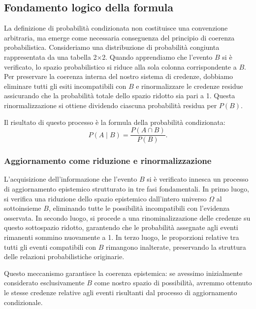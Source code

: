 \documentclass[
  letterpaper,
  DIV=11,
  numbers=noendperiod,
  oneside]{scrreprt}
\theoremstyle{definition}
\theoremstyle{plain}
\theoremstyle{definition}
\theoremstyle{remark}
\begin{document}
\subsection{Fondamento logico della
formula}\label{fondamento-logico-della-formula}

La definizione di probabilità condizionata non costituisce una
convenzione arbitraria, ma emerge come necessaria conseguenza del
principio di coerenza probabilistica. Consideriamo una distribuzione di
probabilità congiunta rappresentata da una tabella 2×2. Quando
apprendiamo che l'evento \(B\) si è verificato, lo spazio probabilistico
si riduce alla sola colonna corrispondente a \(B\). Per preservare la
coerenza interna del nostro sistema di credenze, dobbiamo eliminare
tutti gli esiti incompatibili con \(B\) e rinormalizzare le credenze
residue assicurando che la probabilità totale dello spazio ridotto sia
pari a 1. Questa rinormalizzazione si ottiene dividendo ciascuna
probabilità residua per \(P(B)\).

Il risultato di questo processo è la formula della probabilità
condizionata: \[
P(A \mid B) = \frac{P(A \cap B)}{P(B)}.
\]

\begin{tcolorbox}[enhanced jigsaw, arc=.35mm, breakable, colbacktitle=quarto-callout-important-color!10!white, opacityback=0, toprule=.15mm, rightrule=.15mm, colback=white, opacitybacktitle=0.6, leftrule=.75mm, coltitle=black, bottomtitle=1mm, left=2mm, toptitle=1mm, title=\textcolor{quarto-callout-important-color}{\faExclamation}\hspace{0.5em}{Principio epistemico fondamentale}, titlerule=0mm, bottomrule=.15mm, colframe=quarto-callout-important-color-frame]

\subsubsection*{Aggiornamento come riduzione e
rinormalizzazione}\label{aggiornamento-come-riduzione-e-rinormalizzazione}

L'acquisizione dell'informazione che l'evento \(B\) si è verificato
innesca un processo di aggiornamento epistemico strutturato in tre fasi
fondamentali. In primo luogo, si verifica una riduzione dello spazio
epistemico dall'intero universo \(\Omega\) al sottoinsieme \(B\),
eliminando tutte le possibilità incompatibili con l'evidenza osservata.
In secondo luogo, si procede a una rinominalizzazione delle credenze su
questo sottospazio ridotto, garantendo che le probabilità assegnate agli
eventi rimanenti sommino nuovamente a 1. In terzo luogo, le proporzioni
relative tra tutti gli eventi compatibili con \(B\) rimangono
inalterate, preservando la struttura delle relazioni probabilistiche
originarie.

Questo meccanismo garantisce la coerenza epistemica: se avessimo
inizialmente considerato esclusivamente \(B\) come nostro spazio di
possibilità, avremmo ottenuto le stesse credenze relative agli eventi
risultanti dal processo di aggiornamento condizionale.

\end{tcolorbox}
\end{document}
